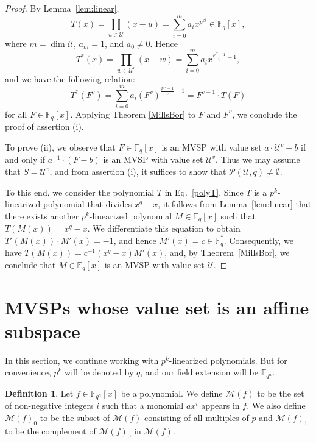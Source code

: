\documentclass[11pt]{amsart}
\newcommand{\m}{\mathcal M}
\newcommand{\F}{\mathbb{F}}
\theoremstyle{definition}
\newtheorem{definition}[theorem]{Definition}
\theoremstyle{remark}
\begin{document}
\begin{proof}
By Lemma~\ref{lem:linear},
\begin{equation}\label{polyT}
T(x)=\prod_{u\in \mathcal U}(x-u)=\sum_{i=0}^ma_ix^{p^{ki}} \in \F_q[x],
\end{equation}
where $m=\dim \mathcal U$,   $a_m=1$, and  $a_0\neq 0$. 
Hence $$T^*(x)=\prod_{w\in\mathcal U^v}(x-w)=\sum_{i=0}^ma_ix^{\frac{p^{ki}-1}{v}+1},$$
and we have the following relation:
$$T^*(F^v)=\sum_{i=0}^ma_i(F^v)^{\frac{p^{ki}-1}{v}+1}=F^{v-1}\cdot T(F)$$
for all $F \in \F_q[x]$. Applying Theorem \ref{MillsBor} to $F$ and $F^v$, we conclude the proof of assertion (i).



To prove (ii), we observe that $F\in\F_q[x]$ is an MVSP with value set $a\cdot\mathcal{U}^v+b$ if and only if $a^{-1}\cdot(F-b)$ is an MVSP with value set $\mathcal{U}^v$. Thus we may assume  that $S=\mathcal{U}^v$, and from assertion (i), it suffices to show that $\mathcal{P}(\mathcal U,q)\neq\emptyset$.

To this end, we consider the polynomial $T$  in Eq.~\eqref{polyT}. Since $T$ is a $p^k$-linearized polynomial that divides $x^q-x$, it follows from Lemma~\ref{lem:linear} that there exists another $p^k$-linearized polynomial $M\in\F_q[x]$ such that $T(M(x))=x^q-x$. We differentiate this equation to obtain $T'(M(x))\cdot M'(x)=-1$, and hence $M'(x)=c\in\F_q^*$. Consequently, we have $T(M(x))=c^{-1}(x^q-x)M'(x)$, and,  by Theorem~\ref{MillsBor}, we conclude that $M\in\F_q[x]$ is an MVSP with value set $\mathcal{U}$.


\end{proof}



\section{MVSPs whose value set is an affine subspace}


In this section, we continue working with  $p^k$-linearized polynomials. But for convenience, $p^k$ will be denoted by $q$, and our field extension will be $\F_{q^n}$.

\begin{definition}
Let $f \in \F_{q^n}[x]$ be a polynomial. We define $\m(f)$ to be the set of non-negative integers $i$ such that a monomial $ax^i$ appears in $f$. We also define $\m(f)_0$ to be the subset of $\m(f)$ consisting of all multiples of $p$  and $\m(f)_1$ to be the complement of $\m(f)_0$ in $\m(f)$.
\end{definition}
\end{document}
